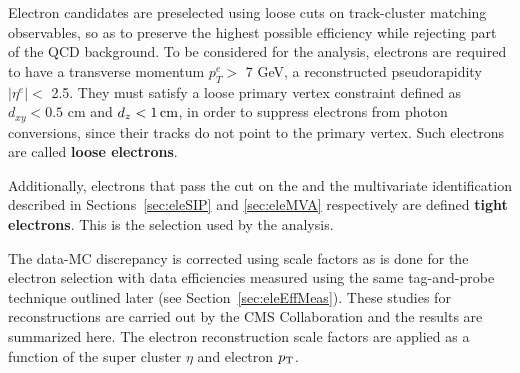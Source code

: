 Electron candidates are preselected using loose cuts on track-cluster matching observables, so as to preserve the highest possible efficiency while rejecting part of the QCD background. To be considered for the analysis, electrons are required to have a
transverse momentum $p^e_T >$ 7 GeV,
a reconstructed pseudorapidity $|\eta^e| <$ 2.5.
They must satisfy a loose primary vertex
constraint defined as $d_{xy} < 0.5$ cm and $d_z < 1\,\text{cm}$,
in order to suppress electrons from photon conversions, since their tracks do not point to the primary vertex.
Such electrons are called {\bf loose electrons}.

Additionally,
electrons that pass the cut on the \SIPthreeD and the multivariate identification described in
Sections~\ref{sec:eleSIP} and \ref{sec:eleMVA} respectively
are defined {\bf tight electrons}.
This is the selection used by the analysis.

The data-MC discrepancy is corrected using scale factors as is done for the electron selection with data efficiencies measured using the same tag-and-probe technique outlined later (see Section~\ref{sec:eleEffMeas}).
These studies for reconstructions are carried out by the CMS Collaboration and the results are summarized here.
The electron reconstruction scale factors
are applied as a function of the super cluster $\eta$ and electron $p_{\mathrm{T}}$.
